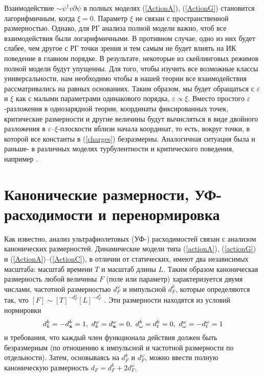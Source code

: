 \documentclass[a4paper,10pt]{article}
\begin{document}
Взаимодействие $\sim \psi^{\dag} v\partial \psi $
в полных моделях (\ref{ActionA}), (\ref{ActionG})
становится лагорифмичным, когда $\xi=0$. Параметр $\xi$ не связан с пространственной размерностью. Однако,
для РГ анализа полной модели важно, чтоб все взаимодействия были логарифмичными.
В противном случае, одно из них будет слабее, чем другое с РГ точки зрения и тем самым не будет влиять на ИК поведение в главном порядке.
В результате, некоторые из скейлинговых режимов полной модели будут упущенны.
 Для того, чтобы изучить все возможные классы универсальности, 
нам необходимо чтобы в нашей теории все взаимодействия рассматривались на равных основаниях.
Таким образом, мы будет обращаться с $\varepsilon$  и $\xi$ как с малыми параметрами одинакового порядка, $\varepsilon \propto \xi$.
Вместо простого $\varepsilon$-разложения в однозарядной теории, координаты фиксированных точек, критические размерности и другие величины будут вычисляться
 в виде двойного разложения в $\varepsilon$--$\xi$-плоскости вблизи начала координат, то есть, вокруг точки, в которой все константы в (\ref{charges})  безразмерны.
Аналогичная ситуация была и  раньше- в различных моделях турбулентности и  критического поведения, например \cite{AHH,Alexa,AIK,AIM,Sak}.

\section{Канонические размерности, УФ-расходимости и перенормировка}
\label{sec:Reno}

Как известно, анализ ультрафиолетовых (УФ-) расходимостей
связан с анализом канонических размерностей.
Динамические модели типа (\ref{actionA}), (\ref{actionG}) и
(\ref{ActionA})--(\ref{ActionC}), 
в отличии от статических, имеют два независимых масштаба: масштаб времени $T$ и масштаб длины $L$.
Таким образом каноническая размерность любой величины $ F $ (поле или параметр) характеризуется двумя числами, частотной размерностью $ d_{F}^{\omega}$ 
и импульсной $d_{F}^{k}$, которые определяются так, что $[F] \sim [T]^{-d_{F}^{\omega}} [L]^{-d_{F}^{k}}$ .
Эти размерности находятся из условий нормировки
\[ d_k^k=-d_{\bf x}^k=1,\ d_k^{\omega} =d_{\bf x}^{\omega }=0,\
d_{\omega }^k=d_t^k=0, \ d_{\omega }^{\omega }=-d_t^{\omega }=1 \]
и  требования, что каждый член функционала действия должен быть безразмерным (по отношению к импульсной и частотной размерности по отдельности).
Затем, основываясь на $d_{F}^{k}$ и $d_{F}^{\omega}$, можно ввести полную каноническую размерность
$d_{F}=d_{F}^{k}+2d_{F}^{\omega}$.
\end{document}
